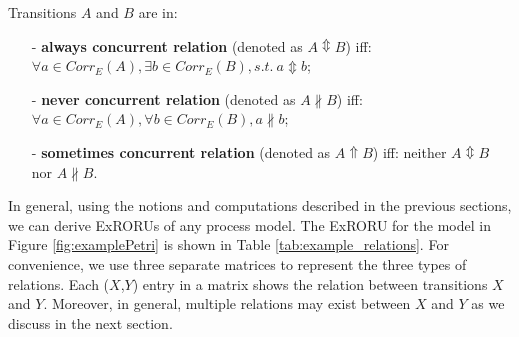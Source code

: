 \documentclass{llncs}
\begin{document}
\begin{definition}\label{def:concurrentRelations}
Transitions $A$ and $B$ are in: 
	\begin{itemize}
		\item[-] \textbf{always concurrent relation} (denoted as $A\Updownarrow B$) iff: $\forall a\in Corr_{E}(A),\exists b\in Corr_{E}(B),s.t.~a\Updownarrow b$;
		\item[-] \textbf{never concurrent relation} (denoted as $A\nparallel B$) iff: $\forall a\in Corr_{E}(A),\forall b\in Corr_{E}(B),a\nparallel b$;
		\item[-] \textbf{sometimes concurrent relation} (denoted as $A\Uparrow B$) iff: neither $A\Updownarrow B$ nor $A\nparallel B$.
	\end{itemize}
\end{definition}

In general, using the notions and computations described in the previous sections, we can derive ExRORUs of any process model. The ExRORU for the model in Figure \ref{fig:examplePetri} is shown in Table \ref{tab:example_relations}. For convenience, we use three separate matrices to represent the three types of relations. Each ($X$,$Y$) entry in a matrix shows the relation between transitions $X$ and $Y$. Moreover, in general, multiple relations may exist between $X$ and $Y$ as we discuss in the next section.
\end{document}
